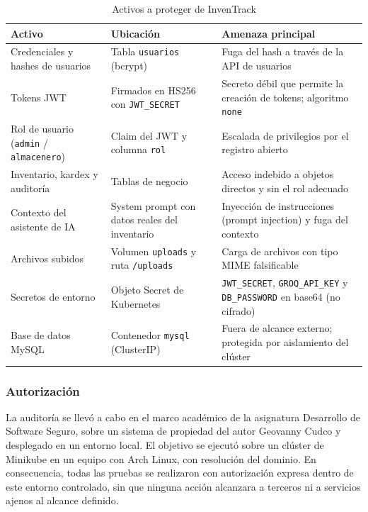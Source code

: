 \documentclass[stu,11pt,spanish,floatsintext]{apa7}
\begin{document}
\begin{table}[H]
  \centering
  \caption{Activos a proteger de InvenTrack}
  \label{tab:activos}
  \begin{tabularx}{\textwidth}{l X X}
    \toprule
    \textbf{Activo} & \textbf{Ubicación} & \textbf{Amenaza principal} \\
    \midrule
    Credenciales y hashes de usuarios & Tabla \texttt{usuarios} (bcrypt) & Fuga del hash a través de la API de usuarios \\
    Tokens JWT & Firmados en HS256 con \texttt{JWT\_SECRET} & Secreto débil que permite la creación de tokens; algoritmo \texttt{none} \\
    Rol de usuario (\texttt{admin} / \texttt{almacenero}) & Claim del JWT y columna \texttt{rol} & Escalada de privilegios por el registro abierto \\
    Inventario, kardex y auditoría & Tablas de negocio & Acceso indebido a objetos directos y sin el rol adecuado \\
    Contexto del asistente de IA & System prompt con datos reales del inventario & Inyección de instrucciones (prompt injection) y fuga del contexto \\
    Archivos subidos & Volumen \texttt{uploads} y ruta \texttt{/uploads} & Carga de archivos con tipo MIME falsificable \\
    Secretos de entorno & Objeto Secret de Kubernetes & \texttt{JWT\_SECRET}, \texttt{GROQ\_API\_KEY} y \texttt{DB\_PASSWORD} en base64 (no cifrado) \\
    Base de datos MySQL & Contenedor \texttt{mysql} (ClusterIP) & Fuera de alcance externo; protegida por aislamiento del clúster \\
    \bottomrule
  \end{tabularx}
\end{table}

\subsubsection{Autorización}

La auditoría se llevó a cabo en el marco académico de la asignatura Desarrollo de Software Seguro, sobre un sistema de propiedad del autor Geovanny Cudco y desplegado en un entorno local. El objetivo se ejecutó sobre un clúster de Minikube en un equipo con Arch Linux, con resolución del dominio. En consecuencia, todas las pruebas se realizaron con autorización expresa dentro de este entorno controlado, sin que ninguna acción alcanzara a terceros ni a servicios ajenos al alcance definido.
\end{document}
